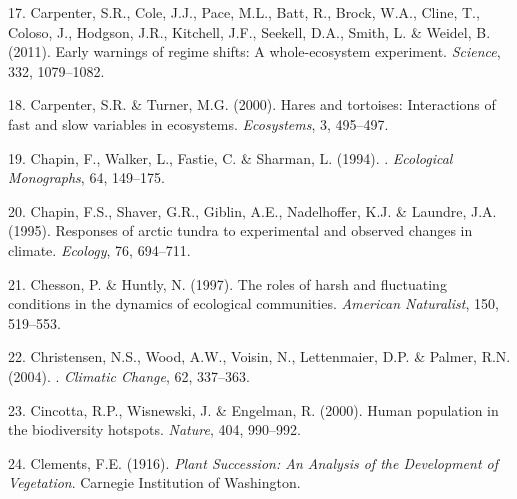 \documentclass[11pt,a4paper,oneside]{article}
\begin{document}
\begin{thebibliography}{79}
17. Carpenter, S.R., Cole, J.J., Pace, M.L., Batt, R., Brock, W.A., Cline, T.,
  Coloso, J., Hodgson, J.R., Kitchell, J.F., Seekell, D.A., Smith, L. \&
  Weidel, B. (2011).
\newblock Early warnings of regime shifts: A whole-ecosystem experiment.
\newblock \emph{Science}, 332, 1079--1082.

18. Carpenter, S.R. \& Turner, M.G. (2000).
\newblock Hares and tortoises: Interactions of fast and slow variables in
  ecosystems.
\newblock \emph{Ecosystems}, 3, 495--497.

19. Chapin, F., Walker, L., Fastie, C. \& Sharman, L. ({1994}).
.
\newblock \emph{Ecological Monographs}, {64}, {149--175}.

20. Chapin, F.S., Shaver, G.R., Giblin, A.E., Nadelhoffer, K.J. \& Laundre, J.A.
  (1995).
\newblock Responses of arctic tundra to experimental and observed changes in
  climate.
\newblock \emph{Ecology}, 76, 694--711.

21. Chesson, P. \& Huntly, N. (1997).
\newblock The roles of harsh and fluctuating conditions in the dynamics of
  ecological communities.
\newblock \emph{American Naturalist}, 150, 519--553.

22. Christensen, N.S., Wood, A.W., Voisin, N., Lettenmaier, D.P. \& Palmer, R.N.
  (2004).
.
\newblock \emph{Climatic Change}, 62, 337--363.

23. Cincotta, R.P., Wisnewski, J. \& Engelman, R. (2000).
\newblock Human population in the biodiversity hotspots.
\newblock \emph{Nature}, 404, 990--992.

24. Clements, F.E. (1916).
\newblock \emph{Plant Succession: An Analysis of the Development of
  Vegetation}.
\newblock Carnegie Institution of Washington.


\end{thebibliography}
\end{document}

